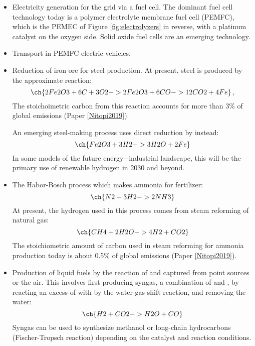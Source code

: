 \begin{itemize}
	\item Electricity generation for the grid via a fuel cell. The dominant fuel cell technology today is a polymer electrolyte membrane fuel cell (PEMFC), which is the PEMEC of Figure \ref{fig:electrolyzers} in reverse, with a platinum catalyst on the oxygen side\cite{Debe2012}. Solid oxide fuel cells are an emerging technology.
	
	\item Transport in PEMFC electric vehicles.
	
	\item Reduction of iron ore for steel production.  At present, steel is produced by the approximate reaction:
	\begin{equation}
	\ch{2 Fe2O3 + 6 C + 3 O2 -> 2 Fe2O3 + 6 CO -> 12 CO2 + 4 Fe}\,, 
	\end{equation} 
	The stoichoimetric carbon from this reaction accounts for more than 3\% of global  emissions (Paper \ref{Nitopi2019}).
	
	An emerging steel-making process\cite{Fischedick2014} uses direct reduction by  instead:
	\begin{equation}
	\ch{Fe2O3 + 3 H2 -> 3 H2O + 2 Fe}
	\end{equation}
	In some models of the future energy+industrial landscape, this will be the primary use of renewable hydrogen in 2030 and beyond\cite{Sgobbi2016}.
	
	\item The Habor-Bosch process which makes ammonia for fertilizer: 
	\begin{equation}
	\ch{N2 + 3 H2 -> 2 NH3}
	\end{equation}
	At present, the hydrogen used in this process comes from steam reforming of natural gas:
	\begin{equation}
	\ch{CH4 + 2 H2O -> 4 H2 + CO2}
	\end{equation}
	The stoichiometric amount of carbon used in steam reforming for ammonia production today is about 0.5\% of global  emissions (Paper \ref{Nitopi2019}).
	
	\item Production of liquid fuels by the reaction of  and  captured from point sources or the air. This involves first producing syngas, a combination of  and , by reacting an excess of  with  by the water-gas shift reaction, and removing the water:
	\begin{equation}
	\ch{H2 + CO2 -> H2O + CO}
	\end{equation}
	Syngas can be used to synthesize methanol or long-chain hydrocarbons (Fischer-Tropsch reaction) depending on the catalyst and reaction conditions\cite{Concepts2003}.
\end{itemize}


